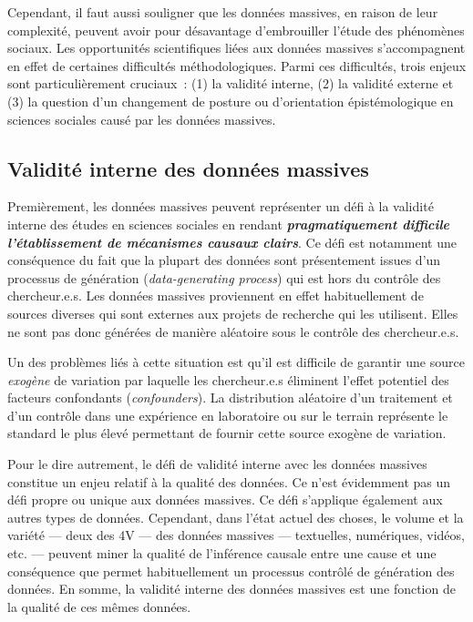 \documentclass[
  letterpaper,
]{scrbook}
\begin{document}
Cependant, il faut aussi souligner que les données massives, en raison
de leur complexité, peuvent avoir pour désavantage d'embrouiller l'étude
des phénomènes sociaux. Les opportunités scientifiques liées aux données
massives s'accompagnent en effet de certaines difficultés
méthodologiques. Parmi ces difficultés, trois enjeux sont
particulièrement cruciaux~: (1) la validité interne, (2) la validité
externe et (3) la question d'un changement de posture ou d'orientation
épistémologique en sciences sociales causé par les données massives.

\hypertarget{validituxe9-interne-des-donnuxe9es-massives}{%
\subsection{Validité interne des données
massives}\label{validituxe9-interne-des-donnuxe9es-massives}}

Premièrement, les données massives peuvent représenter un défi à la
validité interne des études en sciences sociales en rendant
\textbf{\emph{pragmatiquement difficile l'établissement de mécanismes
causaux clairs}}. Ce défi est notamment une conséquence du fait que la
plupart des données sont présentement issues d'un processus de
génération (\emph{data-generating process}) qui est hors du contrôle des
chercheur.e.s. Les données massives proviennent en effet habituellement
de sources diverses qui sont externes aux projets de recherche qui les
utilisent. Elles ne sont pas donc générées de manière aléatoire sous le
contrôle des chercheur.e.s.

Un des problèmes liés à cette situation est qu'il est difficile de
garantir une source \emph{exogène} de variation par laquelle les
chercheur.e.s éliminent l'effet potentiel des facteurs confondants
(\emph{confounders}). La distribution aléatoire d'un traitement et d'un
contrôle dans une expérience en laboratoire ou sur le terrain représente
le standard le plus élevé permettant de fournir cette source exogène de
variation.

Pour le dire autrement, le défi de validité interne avec les données
massives constitue un enjeu relatif à la qualité des données. Ce n'est
évidemment pas un défi propre ou unique aux données massives. Ce défi
s'applique également aux autres types de données. Cependant, dans l'état
actuel des choses, le volume et la variété --- deux des 4V --- des
données massives --- textuelles, numériques, vidéos, etc. --- peuvent
miner la qualité de l'inférence causale entre une cause et une
conséquence que permet habituellement un processus contrôlé de
génération des données. En somme, la validité interne des données
massives est une fonction de la qualité de ces mêmes données.
\end{document}
